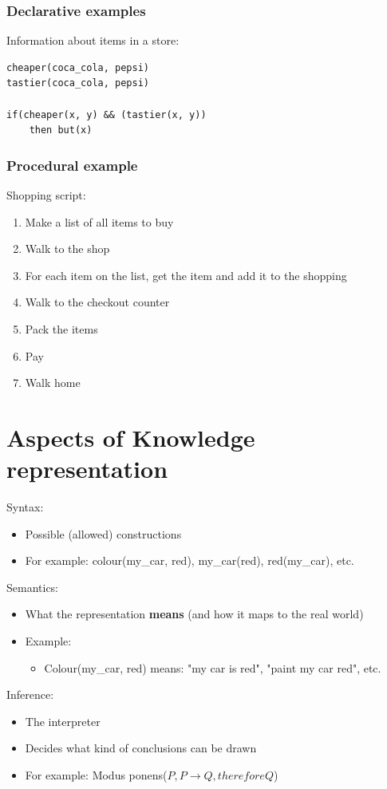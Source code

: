 \subsubsection{Declarative examples}
Information about items in a store:\\
\begin{lstlisting}
cheaper(coca_cola, pepsi)
tastier(coca_cola, pepsi)

if(cheaper(x, y) && (tastier(x, y))
	then but(x)
\end{lstlisting}

\subsubsection{Procedural example}
Shopping script:
\begin{enumerate}
\item Make a list of all items to buy
\item Walk to the shop
\item For each item on the list, get the item and add it to the shopping
\item Walk to the checkout counter
\item Pack the items
\item Pay
\item Walk home
\end{enumerate}

\section{Aspects of Knowledge representation}
Syntax:
\begin{itemize}
\item Possible (allowed) constructions
\item For example: colour(my\_car, red), my\_car(red), red(my\_car), etc.
\end{itemize}

Semantics:
\begin{itemize}
\item What the representation \textbf{means} (and how it maps to the real world)
\item Example:
\begin{itemize}
\item Colour(my\_car, red) means: "my car is red", "paint my car red", etc.
\end{itemize}
\end{itemize}

Inference:
\begin{itemize}
\item The interpreter
\item Decides what kind of conclusions can be drawn
\item For example: Modus ponens($P, P \rightarrow Q, therefore Q$)
\end{itemize}

